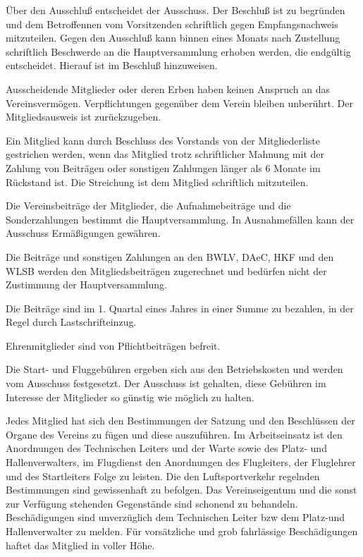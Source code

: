 \documentclass[10pt,a4paper,parskip=half]{scrartcl}
\begin{document}
\begin{contract}
    Über den Ausschluß entscheidet der Ausschuss.
    Der Beschluß ist zu begründen und dem Betroffennen vom Vorsitzenden schriftlich gegen Empfangsnachweis mitzuteilen.
    Gegen den Ausschluß kann binnen eines Monats nach Zustellung schriftlich Beschwerde an die
    Hauptversammlung erhoben werden,
    die endgültig entscheidet.
    Hierauf ist im Beschluß hinzuweisen.
    
    Ausscheidende Mitglieder oder deren Erben haben keinen Anspruch an das Vereinsvermögen.
    Verpflichtungen gegenüber dem Verein bleiben unberührt.
    Der Mitgliedsausweis ist zurückzugeben.

    Ein Mitglied kann durch Beschluss des Vorstands von der Mitgliederliste gestrichen werden,
    wenn das Mitglied trotz schriftlicher Mahnung mit der Zahlung von Beiträgen oder sonstigen Zahlungen länger als 6 Monate im Rückstand ist.
    Die Streichung ist dem Mitglied schriftlich mitzuteilen.
    
    Die Vereinsbeiträge der Mitglieder,
    die Aufnahmebeiträge und die Sonderzahlungen bestimmt die Hauptversammlung.
    In Ausnahmefällen kann der Ausschuss Ermäßigungen gewähren.
    
    Die Beiträge und sonstigen Zahlungen an den BWLV,
    DAeC,
    HKF und den WLSB werden den Mitgliedsbeiträgen zugerechnet und bedürfen nicht der Zustimmung der Hauptversammlung.
    
    Die Beiträge sind im 1. Quartal eines Jahres in einer Summe zu bezahlen,
    in der Regel durch Lastschrifteinzug.
    
    Ehrenmitglieder sind von Pflichtbeiträgen befreit.
    
    Die Start- und Fluggebühren ergeben sich aus den Betriebskosten und werden vom Ausschuss festgesetzt.
    Der Ausschuss ist gehalten,
    diese Gebühren im Interesse der Mitglieder so günstig wie möglich zu halten.
    
    
    Jedes Mitglied hat sich den Bestimmungen der Satzung und den Beschlüssen der Organe des Vereins zu fügen und diese auszuführen.
    Im Arbeitseinsatz ist den Anordnungen des Technischen Leiters und der Warte sowie des Platz- und Hallenverwalters,
    im Flugdienst den Anordnungen des Flugleiters,
    der Fluglehrer und des Startleiters Folge zu leisten.
    Die den Luftsportverkehr regelnden Bestimmungen sind gewissenhaft zu befolgen.
    Das Vereinseigentum und die sonst zur Verfügung stehenden Gegenstände sind schonend zu behandeln.
    Beschädigungen sind unverzüglich dem Technischen Leiter bzw dem Platz-und Hallenverwalter zu melden.
    Für vorsätzliche und grob fahrlässige Beschädigungen haftet das Mitglied in voller Höhe.
    

\end{contract}
\end{document}
